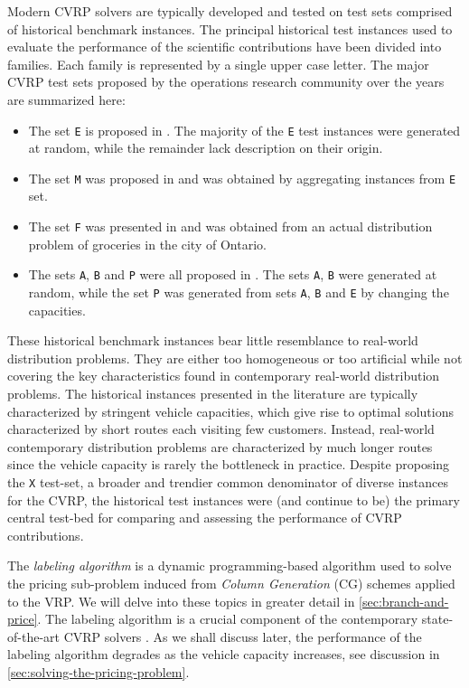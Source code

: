 Modern CVRP solvers are typically developed and tested on test sets comprised of historical benchmark instances.
The principal historical test instances used to evaluate the performance of the scientific contributions have been divided into families.
Each family is represented by a single upper case letter.
The major CVRP test sets proposed by the operations research community over the years are summarized here:
\begin{itemize}
	\setlength{\itemsep}{0pt}
	\setlength{\parskip}{0pt}

	\item The set \texttt{E} is proposed in \textcite{dantzig1959, christofides1969, gaskell1967bases, gillett1974heuristic}.
	      The majority of the \texttt{E} test instances were generated at random, while the remainder lack description on their origin.
	\item The set \texttt{M} was proposed in \textcite{christofides1979vehicle} and was obtained by aggregating instances from \texttt{E} set.
	\item The set \texttt{F} was presented in \textcite{fisher1994} and was obtained from an actual distribution problem of groceries in the city of Ontario.
	\item The sets \texttt{A}, \texttt{B} and \texttt{P} were all proposed in \textcite{augerat1995}.
	      The sets \texttt{A}, \texttt{B} were generated at random, while the set \texttt{P} was generated from sets \texttt{A}, \texttt{B} and \texttt{E} by changing the capacities.
\end{itemize}
These historical benchmark instances bear little resemblance to real-world distribution problems.
They are either too homogeneous or too artificial while not covering the key characteristics found in contemporary real-world distribution problems.
The historical instances presented in the literature are typically characterized by stringent vehicle capacities, which give rise to optimal solutions characterized by short routes each visiting few customers.
Instead, real-world contemporary distribution problems are characterized by much longer routes since the vehicle capacity is rarely the bottleneck in practice.
Despite \textcite{uchoa2017} proposing the \texttt{X} test-set, a broader and trendier common denominator of diverse instances for the CVRP, the historical test instances were (and continue to be) the primary central test-bed for comparing and assessing the performance of CVRP contributions.

The \textit{labeling algorithm} is a dynamic programming-based algorithm used to solve the pricing sub-problem induced from \textit{Column Generation} (CG) schemes applied to the VRP.
We will delve into these topics in greater detail in \cref{sec:branch-and-price}.
The labeling algorithm is a crucial component of the contemporary state-of-the-art CVRP solvers \parencite{gutierrez-jarpa2010, archetti2011, bettinelli2011, contardo2014, contardo2015, pecin2017new, pecin2017improved, pessoa2020generic}.
As we shall discuss later, the performance of the labeling algorithm degrades as the vehicle capacity increases, see discussion in \cref{sec:solving-the-pricing-problem}.


